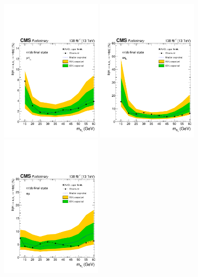 \begin{figure}[h!]
    \begin{center}
        \includegraphics[width=0.45\textwidth]{figures/ch-10-results/Limit_mt_prelim.pdf}
        \includegraphics[width=0.45\textwidth]{figures/ch-10-results/Limit_et_prelim.pdf}\\
        \includegraphics[width=0.45\textwidth]{figures/ch-10-results/Limit_em_prelim.pdf}

\end{center}
\end{figure}
